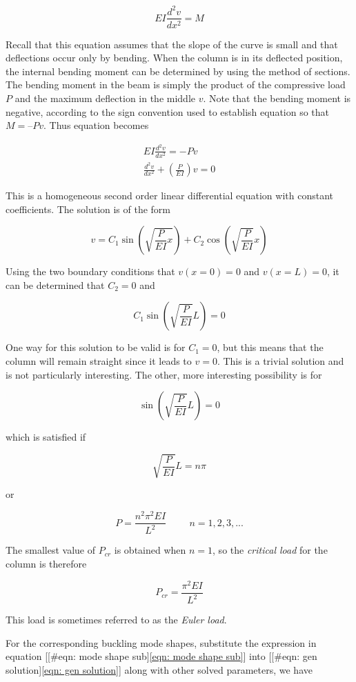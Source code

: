 \documentclass[a4paper,openany,12pt]{book}
\begin{document}
{{$$EI\frac{d^2v}{dx^2} = M$$

Recall that this equation assumes that the slope of the curve is small
and that deflections occur only by bending. When the column is in its
deflected position, the internal bending moment can be determined by
using the method of sections. The bending moment in the beam is simply
the product of the compressive load \(P\) and the maximum deflection in
the middle \(v\). Note that the bending moment is negative, according to
the sign convention used to establish equation so that \(M = –Pv\). Thus
equation becomes


$$\begin{gathered}
    EI\frac{d^2v}{dx^2} =  - Pv \\
    \frac{d^2v}{dx^2} + \left( \frac{P}{EI} \right)v = 0 
  \end{gathered}$$

This is a homogeneous second order linear differential equation with
constant coefficients. The solution is of the form

$$ v = C_1\sin \left( \sqrt {\frac{P}{EI} x} \right) + C_2\cos \left( \sqrt {\frac{P}{EI}} x \right)$$

Using the two boundary conditions that \(v(x = 0) = 0\) and
\(v(x = L) = 0\), it can be determined that \(C_2 = 0\) and

$$C_1\sin \left( \sqrt {\frac{P}{EI}} L \right) = 0$$

One way for this solution to be valid is for \(C_1 = 0\), but this means
that the column will remain straight since it leads to \(v = 0\). This is
a trivial solution and is not particularly interesting. The other, more
interesting possibility is for

$$\sin \left( \sqrt {\frac{P}{EI}} L \right) = 0$$

which is satisfied if

$$ \sqrt {\frac{P}{EI}} L = n\pi$$

or

$$P = \frac{n^2\pi^2EI}{L^2} \hspace{1cm}n = 1,2,3,...$$

The smallest value of \(P_{cr}\) is obtained when \(n = 1\), so the
\emph{critical load} for the column is therefore

$$P_{cr} = \frac{\pi ^2EI}{L^2}$$

This load is sometimes referred to as the \emph{Euler load}.

For the corresponding buckling mode shapes, substitute the expression in
equation [[\#eqn: mode shape sub]\ref{eqn: mode shape sub}] into
[[\#eqn: gen solution]\ref{eqn: gen solution}] along with other solved
parameters, we have

}}
\end{document}
